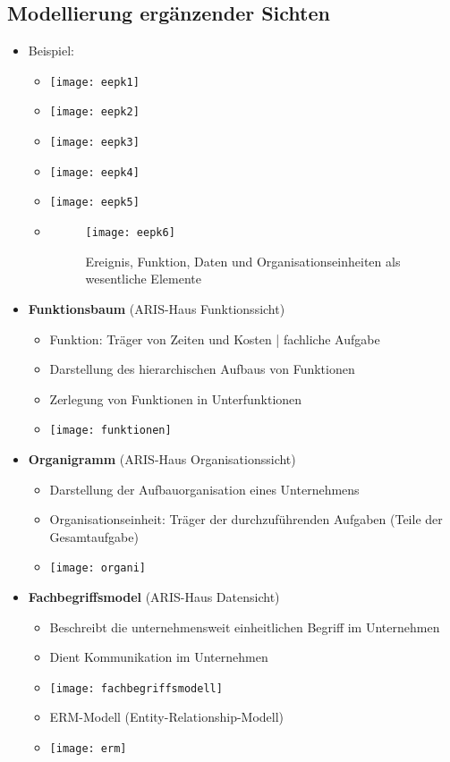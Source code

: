 \subsection{Modellierung ergänzender Sichten}
\begin{itemize}
	\item Beispiel:
		\begin{itemize}
		\item[] \texttt{[image: eepk1]}
		\item[] \texttt{[image: eepk2]}
		\item[] \texttt{[image: eepk3]}
		\item[] \texttt{[image: eepk4]}
		\item[] \texttt{[image: eepk5]}
		
		\item[] 
			\begin{figure}[H]
			\centering
			\texttt{[image: eepk6]}
			\caption{Ereignis, Funktion, Daten und Organisationseinheiten als wesentliche Elemente}
			\end{figure}
		\end{itemize}
	
	\pagebreak
	
	\item \textbf{Funktionsbaum} (ARIS-Haus Funktionssicht)
		\begin{itemize}
		\item Funktion: Träger von Zeiten und Kosten | fachliche Aufgabe
		\item Darstellung des hierarchischen Aufbaus von Funktionen
		\item Zerlegung von Funktionen in Unterfunktionen
		\item[] \texttt{[image: funktionen]}
		\end{itemize}
		
	\item \textbf{Organigramm} (ARIS-Haus Organisationssicht)
		\begin{itemize}
		\item Darstellung der Aufbauorganisation eines Unternehmens
		\item Organisationseinheit: Träger der durchzuführenden Aufgaben (Teile der Gesamtaufgabe)
		\item[] \texttt{[image: organi]}
		\end{itemize}
	
	\pagebreak
	
	\item \textbf{Fachbegriffsmodel} (ARIS-Haus Datensicht)
		\begin{itemize}
		\item Beschreibt die unternehmensweit einheitlichen Begriff im Unternehmen
		\item Dient Kommunikation im Unternehmen
		\item[] \texttt{[image: fachbegriffsmodell]}
		\item ERM-Modell (Entity-Relationship-Modell)
		\item[] \texttt{[image: erm]}
		\end{itemize}
\end{itemize}

